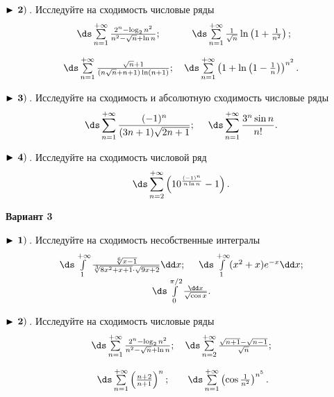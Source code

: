 $\bf\blacktriangleright\,2)\,$. Исследуйте на сходимость числовые ряды
\begin{equation*}
    \begin{array}{ccc}
        \,\ds\sum\limits_{n=1}^{+\infty}\frac{2^n-\log_2 n^2}{n^2-\sqrt{n}+\ln n}
        ; &   \,\ds\sum\limits_{n=1}^{+\infty}\frac{1}{\sqrt{n}}\ln\left(1+\frac{1}{n^2}\right)
        ; \\[6mm]
        \,\ds\sum\limits_{n=1}^{+\infty}\frac{\sqrt{n}+1}{(n\sqrt{n}+n+1)\ln (n+1)}
        ; &    \,\ds\sum\limits_{n=1}^{+\infty}\left(1+\ln\left(1-\frac{1}{n}\right)\right)^{n^2}
        .
    \end{array}
\end{equation*}


$\bf\blacktriangleright\,3)\,$. Исследуйте на сходимость и абсолютную сходимость числовые ряды
\begin{equation*}
    \,\ds\sum\limits_{n=1}^{+\infty}\frac{(-1)^n}{(3n+1)\sqrt{2n+1}}
    ;\quad\,   \,\ds\sum\limits_{n=1}^{+\infty}\frac{3^n\sin n}{n!}
    .
\end{equation*}


$\bf\blacktriangleright\,4)\,$. Исследуйте на сходимость числовой ряд
\begin{equation*}
    \,\ds\sum\limits_{n=2}^{+\infty}\left(10^{\frac{(-1)^n}{n\ln n}}-1\right)
    .
\end{equation*}

\centerline{\bf\Large Вариант 3}


$\bf\blacktriangleright\,1)\,$. Исследуйте на сходимость несобственные интегралы
\begin{equation*}
\begin{array}{cc}
  \,\ds\int\limits_{1}^{+\infty} \frac{\sqrt[6]{x-1}}{\sqrt[3]{8x^2+x+1}\cdot \sqrt{9x+2}}\dd x
  ;\quad\,    \,\ds\int\limits_{1}^{+\infty} (x^2+x)e^{-x}\dd x
  ;\\
  \,\ds\int\limits_{0}^{\pi/2}\frac{\dd x}{\sqrt{\cos x}}
  .
\end{array}
\end{equation*}


$\bf\blacktriangleright\,2)\,$. Исследуйте на сходимость числовые ряды
\begin{equation*}
    \begin{array}{ccc}
        \,\ds\sum\limits_{n=1}^{+\infty}\frac{2^n-\log_2 n^2}{n^2-\sqrt{n}+\ln n}
        ; &   \,\ds\sum\limits_{n=2}^{+\infty}\frac{\sqrt{n+1}-\sqrt{n-1}}{\sqrt{n}}
        ; \\[6mm]
        \,\ds\sum\limits_{n=1}^{+\infty}\left(\frac{n+2}{n+1}\right)^{n}
        ; &    \,\ds\sum\limits_{n=1}^{+\infty}\left(\cos\frac{1}{n^2}\right)^{n^5}
        .
    \end{array}
\end{equation*}


